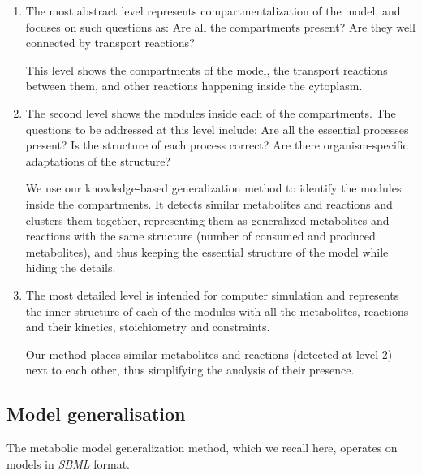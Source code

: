 \documentclass{bmcart}
\begin{document}
\begin{enumerate}
\item The most abstract level represents compartmentalization of the model, and focuses on such questions as: Are all the compartments present? Are they well connected by transport reactions?

This level shows the compartments of the model, the transport reactions between them, and other reactions happening inside the cytoplasm.

\item The second level shows the modules inside each of the compartments. The questions to be addressed at this level include: Are all the essential processes present? Is the structure of each process correct? Are there organism-specific adaptations of the structure?

We use our knowledge-based generalization method to identify the modules inside the compartments. It detects similar metabolites and reactions and clusters them together, representing them as generalized metabolites and reactions with the same structure (number of consumed and produced metabolites), and thus keeping the essential structure of the model while hiding the details.

\item The most detailed level is intended for computer simulation and represents the inner structure of each of the modules with all the metabolites, reactions and their kinetics, stoichiometry and constraints.

Our method places similar metabolites and reactions (detected at level 2) next to each other, thus simplifying the analysis of their presence.

\end{enumerate}

\subsection*{Model generalisation}
The metabolic model generalization method\cite{Zhukova2014}, which we recall here, operates on models in \textit{SBML}\cite{Hucka08} format.

\end{document}
